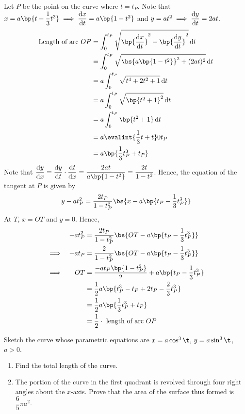 \documentclass{echw}
\begin{document}
    \solution
        Let $P$ be the point on the curve where $t = t_P$. Note that $x = a\bp{t - \dfrac13 t^3} \implies \der{x}{t} = a\bp{1 - t^2}$ and $y = at^2 \implies \dfrac{\mathrm{d} y}{\mathrm{d} t} = 2at$.
        \begin{align*}
            \text{Length of arc } OP &= \int_0^{t_P} \sqrt{\bp{\der{x}{t}}^2 + \bp{\der{y}{t}}^2} \d t\\
            &= \int_0^{t_P} \sqrt{\bs{a\bp{1-t^2}}^2 + (2at)^2} \d t\\
            &= a \int_0^{t_P} \sqrt{t^4 + 2t^2 + 1} \d t\\
            &= a \int_0^{t_P} \sqrt{\bp{t^2 + 1}^2} \d t\\
            &= a \int_0^{t_P} \bp{t^2 + 1} \d t\\
            &= a \evalint{\dfrac13 t + t}0{t_P}\\
            &= a \bp{\dfrac13 t_P^3 + t_P}
        \end{align*}
        Note that $\der{y}{x} = \der{y}{t} \cdot \der{t}{x} = \dfrac{2at}{a\bp{1 - t^2}} = \dfrac{2t}{1-t^2}$. Hence, the equation of the tangent at $P$ is given by
        \[
            y - at_P^2 = \dfrac{2t_P}{1 - t_P^2} \bs{x - a\bp{t_P - \dfrac13 t_P^3}}
        \]
        At $T$, $x = OT$ and $y = 0$. Hence,
        \begin{alignat*}{2}
            && - at_P^2 &= \dfrac{2t_P}{1 - t_P^2} \bs{OT - a\bp{t_P - \dfrac13 t_P^3}}\\
            \implies && - at_P &= \dfrac{2}{1 - t_P^2} \bs{OT - a\bp{t_P - \dfrac13 t_P^3}}\\
            \implies && OT &= \dfrac{- at_P \bp{1 - t_P^2}}2 + a\bp{t_P - \dfrac13 t_P^3}\\
            && &= \dfrac12 a \bp{t_P^3 - t_P + 2t_P - \dfrac23 t_P^3}\\
            && &= \dfrac12 a \bp{\dfrac13 t_P^3 + t_P}\\
            && &= \dfrac12 \cdot \text{ length of arc } OP
        \end{alignat*}


    \problem{}
        Sketch the curve whose parametric equations are $x = a\cos^3 \t, \, y = a\sin^3 \t$, $a > 0$.

        \begin{enumerate}
            \item Find the total length of the curve.
            \item The portion of the curve in the first quadrant is revolved through four right angles about the $x$-axis. Prove that the area of the surface thus formed is $\dfrac65 \pi a^2$.
        \end{enumerate}
\end{document}
